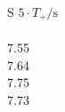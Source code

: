 \begin{minipage}{0.49\textwidth}
 \centering
 \begin{tabular}{S }
 \toprule
${5} \cdot T_{+}/ \si{\second}$ \\
 \\
 7.55 \\
 7.64 \\
 7.75 \\
 7.73 \\
 \bottomrule
 \end{tabular}
 \label{tab:T_gleichsinnig_60}
  \end{minipage}
